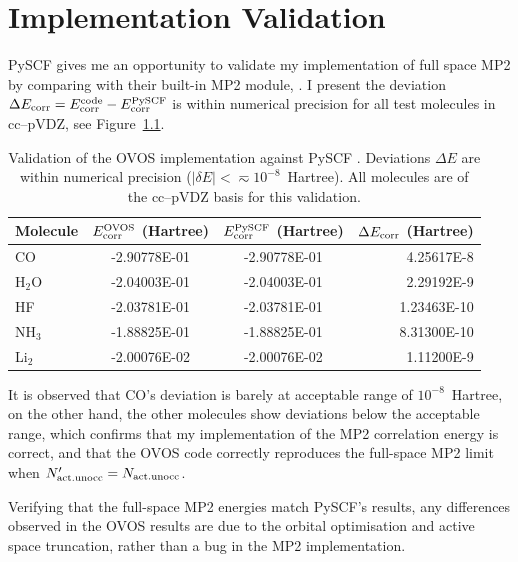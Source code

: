 \chapter{Implementation Validation}
\label{appa:implementation_validation}

PySCF gives me an opportunity to validate my implementation of full space MP2 by comparing with their built-in MP2 module, . I present the deviation $\Delta E_{\rm corr} = E_{\rm corr}^{\rm code} - E_{\rm corr}^{\rm PySCF}$ is within numerical precision for all test molecules in cc--pVDZ, see Figure~\ref{tab:validation}. 

\begin{table}[ht]
    \centering
    \begin{tabular}{lccr}
        \hline
        Molecule & $E_{\rm corr}^{\rm OVOS}$ (Hartree) & $E_{\rm corr}^{\rm PySCF}$ (Hartree) & $\Delta E_{\rm corr}$ (Hartree) \\
        \hline  
        CO       & -2.90778E-01 & -2.90778E-01    & 4.25617E-8   \\
        H$_2$O   & -2.04003E-01 & -2.04003E-01    & 2.29192E-9   \\
        HF       & -2.03781E-01 & -2.03781E-01    & 1.23463E-10  \\
        NH$_3$      & -1.88825E-01 & -1.88825E-01    & 8.31300E-10  \\
        Li$_2$      & -2.00076E-02 & -2.00076E-02    & 1.11200E-9   \\
        \hline
    \end{tabular}
    \caption{Validation of the OVOS implementation against PySCF .
    Deviations $\Delta E$ are within numerical precision ($|\delta E| <\eqsim 10^{-8}$~Hartree). All molecules are of the cc--pVDZ basis for this validation.}
    \label{tab:validation}
\end{table}

It is observed that CO's deviation is barely at acceptable range of $10^{-8}$~Hartree, on the other hand, the other molecules show deviations below the acceptable range, which confirms that my implementation of the MP2 correlation energy is correct, and that the OVOS code correctly reproduces the full-space MP2 limit when $N'_{\rm act.unocc} = N_{\rm act.unocc}$.

Verifying that the full-space MP2 energies match PySCF's results, any differences observed in the OVOS results are due to the orbital optimisation and active space truncation, rather than a bug in the MP2 implementation. 

